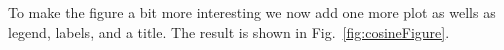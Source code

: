 To make the figure a bit more interesting we now add one more plot as wells as legend, labels, and a title. The result is shown in Fig.~\ref{fig:cosineFigure}.